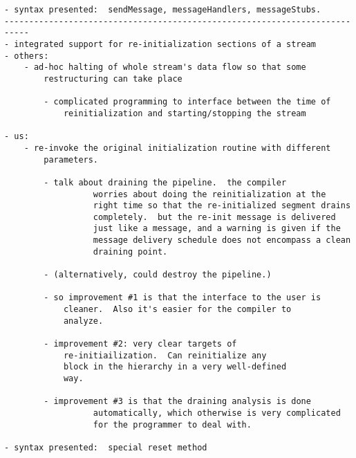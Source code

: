 \begin{verbatim}
- syntax presented:  sendMessage, messageHandlers, messageStubs.
---------------------------------------------------------------------------
- integrated support for re-initialization sections of a stream
- others:	
	- ad-hoc halting of whole stream's data flow so that some
		restructuring can take place
		
		- complicated programming to interface between the time of
			reinitialization and starting/stopping the stream

- us:
	- re-invoke the original initialization routine with different 
		parameters.

		- talk about draining the pipeline.  the compiler
                  worries about doing the reinitialization at the
                  right time so that the re-initialized segment drains
                  completely.  but the re-init message is delivered
                  just like a message, and a warning is given if the
                  message delivery schedule does not encompass a clean
                  draining point.

		- (alternatively, could destroy the pipeline.)

		- so improvement #1 is that the interface to the user is 
			cleaner.  Also it's easier for the compiler to 
			analyze.

		- improvement #2: very clear targets of
			re-initiailization.  Can reinitialize any
			block in the hierarchy in a very well-defined
			way.

		- improvement #3 is that the draining analysis is done
                  automatically, which otherwise is very complicated
                  for the programmer to deal with.

- syntax presented:  special reset method

\end{verbatim}






